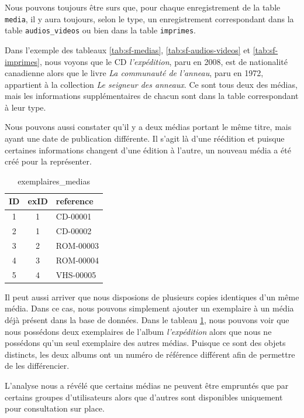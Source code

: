 \documentclass[letter, 11pt]{report}
\begin{document}
Nous pouvons toujours être surs que, pour chaque enregistrement de la table \texttt{media}, il y aura toujours, selon le type, un enregistrement correspondant dans la table \texttt{audios\_videos} ou bien dans la table \texttt{imprimes}.

Dans l'exemple des tableaux \ref{tab:sf-medias}, \ref{tab:sf-audios-videos} et \ref{tab:sf-imprimes}, nous voyons que le CD \emph{l'expédition}, paru en 2008, est de nationalité canadienne alors que le livre \emph{La communauté de l'anneau}, paru en 1972, appartient à la collection \emph{Le seigneur des anneaux}. Ce sont tous deux des médias, mais les informations supplémentaires de chacun sont dans la table correspondant à leur type.

Nous pouvons aussi constater qu'il y a deux médias portant le même titre, mais ayant une date de publication différente. Il s'agit là d'une réédition et puisque certaines informations changent d'une édition à l'autre, un nouveau média a été créé pour la représenter.

\begin{table}[htbp]
	\caption{exemplaires\_medias}
	\label{tab:sf-exemplaires-medias}
	\begin{center}
		\begin{tabular}{|c|c|l|}
			\hline
			ID & exID & reference \\
			\hline
			1  & 1    & CD-00001 \\
			2  & 1    & CD-00002 \\
			3  & 2    & ROM-00003 \\
			4  & 3    & ROM-00004 \\
			5  & 4    & VHS-00005 \\
			\hline
		\end{tabular}
	\end{center}
\end{table}

Il peut aussi arriver que nous disposions de plusieurs copies identiques d'un même média. Dans ce cas, nous pouvons simplement ajouter un exemplaire à un média déjà présent dans la base de données. Dans le tableau \ref{tab:sf-exemplaires-medias}, nous pouvons voir que nous possédons deux exemplaires de l'album \emph{l'expédition} alors que nous ne possédons qu'un seul exemplaire des autres médias. Puisque ce sont des objets distincts, les deux albums ont un numéro de référence différent afin de permettre de les différencier.

L'analyse nous a révélé que certains médias ne peuvent être empruntés que par certains groupes d'utilisateurs alors que d'autres sont disponibles uniquement pour consultation sur place.
\end{document}
